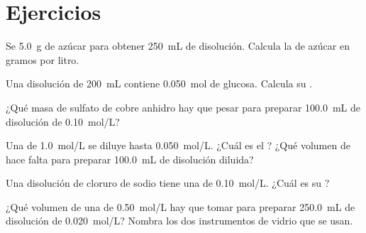 \section{Ejercicios}

\begin{exercise}[$\star$]\label{exo:g10:concentration-and-dilution:1}
Se  \qty{5.0}{g} de azúcar para obtener \qty{250}{mL} de
disolución. Calcula la  de azúcar en gramos por
litro.
\end{exercise}

\begin{exercise}[$\star$]\label{exo:g10:concentration-and-dilution:2}
Una disolución de \qty{200}{mL} contiene \qty{0.050}{mol} de glucosa.
Calcula su .
\end{exercise}

\begin{exercise}[$\star$]\label{exo:g10:concentration-and-dilution:3}
¿Qué masa de sulfato de cobre anhidro  hay que pesar para
preparar \qty{100.0}{mL} de disolución de \qty{0.10}{mol/L}?
\end{exercise}

\begin{exercise}[$\star$]\label{exo:g10:concentration-and-dilution:4}
Una  de \qty{1.0}{mol/L} se diluye hasta
\qty{0.050}{mol/L}. ¿Cuál es el ? ¿Qué volumen de
 hace falta para preparar \qty{100.0}{mL} de disolución
diluida?
\end{exercise}

\begin{exercise}[$\star$]\label{exo:g10:concentration-and-dilution:5}
Una disolución de cloruro de sodio tiene una  de
\qty{0.10}{mol/L}. ¿Cuál es su ?
\end{exercise}

\begin{exercise}[$\star\star$]\label{exo:g10:concentration-and-dilution:6}
¿Qué volumen de una  de \qty{0.50}{mol/L} hay que tomar
para preparar \qty{250.0}{mL} de disolución de \qty{0.020}{mol/L}?
Nombra los dos instrumentos de vidrio que se usan.
\end{exercise}

